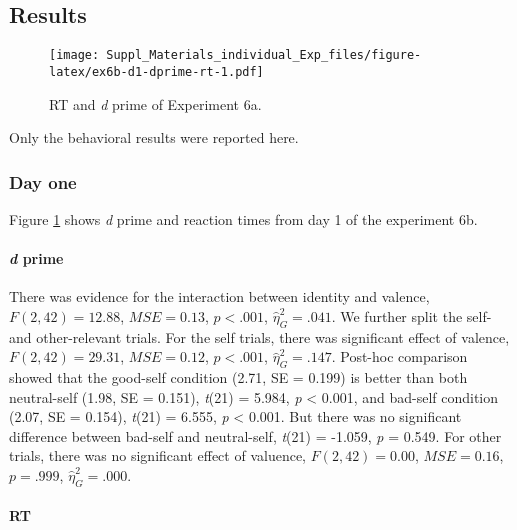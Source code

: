 \documentclass[man]{apa6}
\let\oldparagraph\paragraph
\renewcommand{\paragraph}[1]{\oldparagraph{#1}\mbox{}}
\begin{document}
\hypertarget{results-10}{%
\subsection{Results}\label{results-10}}

\begin{figure}
\centering
\texttt{[image: Suppl\_Materials\_individual\_Exp\_files/figure-latex/ex6b-d1-dprime-rt-1.pdf]}
\caption{\label{fig:ex6b-d1-dprime-rt}RT and \emph{d} prime of Experiment 6a.}
\end{figure}

Only the behavioral results were reported here.

\hypertarget{day-one}{%
\subsubsection{Day one}\label{day-one}}

Figure \ref{fig:ex6b-d1-dprime-rt} shows \emph{d} prime and reaction times from day 1 of the experiment 6b.

\hypertarget{d-prime-7}{%
\paragraph{\texorpdfstring{\emph{d} prime}{d prime}}\label{d-prime-7}}

There was evidence for the interaction between identity and valence, \(F(2, 42) = 12.88\), \(\mathit{MSE} = 0.13\), \(p < .001\), \(\hat{\eta}^2_G = .041\). We further split the self- and other-relevant trials. For the self trials, there was significant effect of valence, \(F(2, 42) = 29.31\), \(\mathit{MSE} = 0.12\), \(p < .001\), \(\hat{\eta}^2_G = .147\). Post-hoc comparison showed that the good-self condition (2.71, SE = 0.199) is better than both neutral-self (1.98, SE = 0.151), \emph{t}(21) = 5.984, \emph{p} \textless{} 0.001, and bad-self condition (2.07, SE = 0.154), \emph{t}(21) = 6.555, \emph{p} \textless{} 0.001. But there was no significant difference between bad-self and neutral-self, \emph{t}(21) = -1.059, \emph{p} = 0.549. For other trials, there was no significant effect of valuence, \(F(2, 42) = 0.00\), \(\mathit{MSE} = 0.16\), \(p = .999\), \(\hat{\eta}^2_G = .000\).

\hypertarget{rt}{%
\paragraph{RT}\label{rt}}
\end{document}
